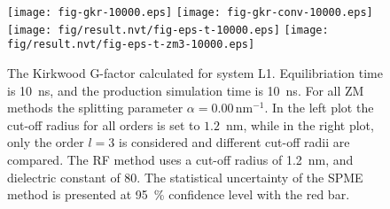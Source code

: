 \documentclass[a4paper,reprint,unsortedaddress,onecolumn]{revtex4-1}
\begin{document}
\begin{figure}
  \centering
  \texttt{[image: fig-gkr-10000.eps]}
  \texttt{[image: fig-gkr-conv-10000.eps]}
  \texttt{[image: fig/result.nvt/fig-eps-t-10000.eps]}
  \texttt{[image: fig/result.nvt/fig-eps-t-zm3-10000.eps]}
  \caption{The Kirkwood G-factor calculated for system L1. Equilibriation time is 10~ns, and the production simulation time is 10~ns.
    For all ZM methods the splitting parameter $\alpha = 0.00\,\textrm{nm}^{-1}$.
    In the left plot the cut-off radius for all orders is set to $1.2$~nm, while
    in the right plot, only the order $l=3$ is considered and different cut-off radii are compared.
    The RF method uses a cut-off radius of 1.2~nm, and dielectric constant of 80.
    The statistical uncertainty of the SPME method is presented at 95~\% confidence level with the red bar.
  }
  \label{fig:tmp3}
\end{figure}





\newpage
{}

\end{document}

